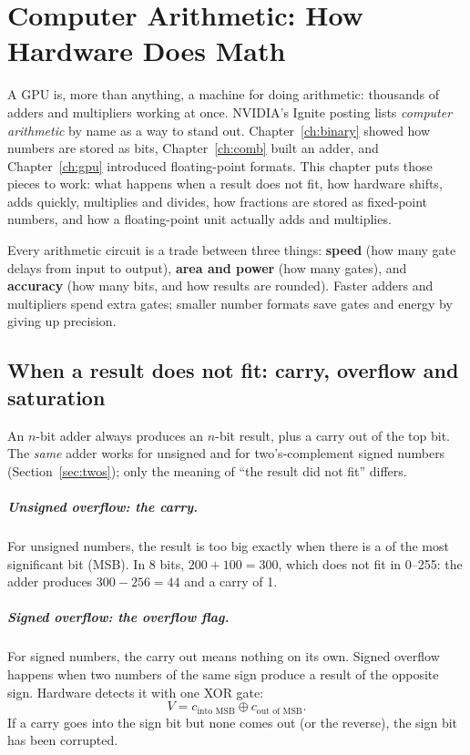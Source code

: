 \chapter{Computer Arithmetic: How Hardware Does Math}
\label{ch:arith}

A GPU is, more than anything, a machine for doing arithmetic: thousands of adders and multipliers working at once. NVIDIA's Ignite posting lists \emph{computer arithmetic} by name as a way to stand out. Chapter~\ref{ch:binary} showed how numbers are stored as bits, Chapter~\ref{ch:comb} built an adder, and Chapter~\ref{ch:gpu} introduced floating-point formats. This chapter puts those pieces to work: what happens when a result does not fit, how hardware shifts, adds quickly, multiplies and divides, how fractions are stored as fixed-point numbers, and how a floating-point unit actually adds and multiplies.

\begin{bigidea}
Every arithmetic circuit is a trade between three things: \textbf{speed} (how many gate delays from input to output), \textbf{area and power} (how many gates), and \textbf{accuracy} (how many bits, and how results are rounded). Faster adders and multipliers spend extra gates; smaller number formats save gates and energy by giving up precision.
\end{bigidea}

\section{When a result does not fit: carry, overflow and saturation}
\label{sec:overflow}

An $n$-bit adder always produces an $n$-bit result, plus a carry out of the top bit. The \emph{same} adder works for unsigned and for two's-complement signed numbers (Section~\ref{sec:twos}); only the meaning of ``the result did not fit'' differs.

\paragraph{Unsigned overflow: the carry.} For unsigned numbers, the result is too big exactly when there is a  of the most significant bit (MSB). In 8 bits, $200 + 100 = 300$, which does not fit in 0--255: the adder produces $300 - 256 = 44$ and a carry of 1.

\paragraph{Signed overflow: the overflow flag.} For signed numbers, the carry out means nothing on its own. Signed overflow happens when two numbers of the same sign produce a result of the opposite sign. Hardware detects it with one XOR gate:
\[
  V = c_{\text{into MSB}} \oplus c_{\text{out of MSB}}.
\]
If a carry goes into the sign bit but none comes out (or the reverse), the sign bit has been corrupted.


